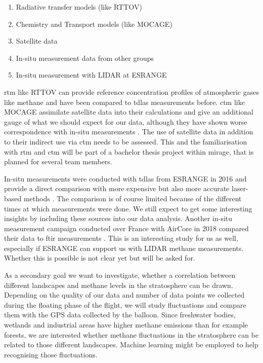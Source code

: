 \documentclass[12pt,a4paper]{report}
\begin{document}
\begin{enumerate}
    \item Radiative transfer models (like RTTOV)
    \item Chemistry and Transport models (like MOCAGE)
    \item Satellite data
    \item In-situ measurement data from other groups
    \item In-situ measurement with LIDAR at ESRANGE
\end{enumerate}

\ac{rtm} like RTTOV can provide reference concentration profiles of atmospheric gases like methane and have been compared to \ac{tdlas} measurements before. \ac{ctm} like MOCAGE assimilate satellite data into their calculations and give an additional gauge of what we should expect for our data, although they have shown worse correspondence with in-situ measurements \cite{joly2020}. The use of satellite data in addition to their indirect use via \ac{ctm} needs to be assessed. This and the familiarisation with \ac{rtm} and \ac{ctm} will be part of a bachelor thesis project within \ac{mirage}, that is planned for several team members.

In-situ measurements were conducted with \ac{tdlas} from ESRANGE in 2016 and provide a direct comparison with more expensive but also more accurate laser-based methods \cite{Khair2017}. The comparison is of course limited because of the different times at which measurements were done. We still expect to get some interesting insights by including these sources into our data analysis. Another in-situ measurement campaign conducted over France with AirCore in 2018 compared their data to \ac{ftir} measurements \cite{RINGO}. This is an interesting study for us as well, especially if ESRANGE can support us with LIDAR methane measurements. Whether this is possible is not clear yet but will be asked for.

As a secondary goal we want to investigate, whether a correlation between different landscapes and methane levels in the stratosphere can be drawn. Depending on the quality of our data and number of data points we collected during the floating phase of the flight, we will study fluctuations and compare them with the GPS data collected by the balloon. Since freshwater bodies, wetlands and industrial areas have higher methane emissions than for example forests, we are interested whether methane fluctuations in the stratosphere can be related to those different landscapes. Machine learning might be employed to help recognising those fluctuations.
\end{document}
